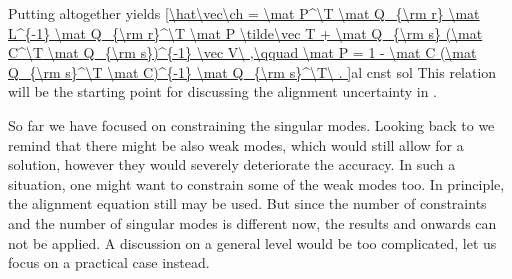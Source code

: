 Putting altogether yields
\eqref{\hat\vec\ch =
	\mat P^\T \mat Q_{\rm r} \mat L^{-1} \mat Q_{\rm r}^\T \mat P \tilde\vec T
	+ \mat Q_{\rm s} (\mat C^\T \mat Q_{\rm s})^{-1} \vec V\ ,\qquad
	\mat P = 1 - \mat C (\mat Q_{\rm s}^\T \mat C)^{-1} \mat Q_{\rm s}^\T\ .
}{al cnst sol}
This relation will be the starting point for discussing the alignment uncertainty in .

\iffalse
If we neglect the experimental errors that enter the $\tilde\vec T$ vector, it can be calculated from \Eq{al exact fit equation}: $\tilde\vec T = \bar\mat S \vec\ch$. We recall that $\vec\ch$ is the vector of true (not estimated) residuals. As the singular modes of $\tilde\mat S$ and $\bar\mat S$ are the same, one finds that $\bar\mat S E = 0$ too. Consequently, \Eq{al T no sing cont} leads to $\La = 0$. If the experimental errors are not neglected, the relation becomes only approximative: $\La \approx 0$. This provides a consistency check that may be used during real data analysis.
\fi

So far we have focused on constraining the singular modes. Looking back to  we remind that there might be also weak modes, which would still allow for a solution, however they would severely deteriorate the accuracy. In such a situation, one might want to constrain some of the weak modes too. In principle, the alignment equation  still may be used. But since the number of constraints and the number of singular modes is different now, the results  and onwards can not be applied. A discussion on a general level would be too complicated, let us focus on a practical case instead.

